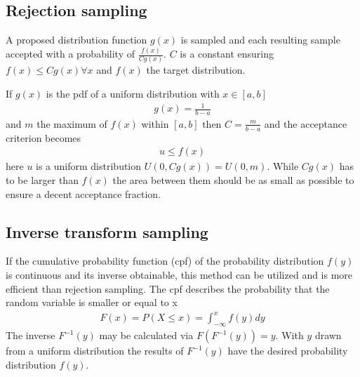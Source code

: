 \documentclass[letterpaper,10pt,english]{sphinxmanual}
\begin{document}
\subsection{Rejection sampling}
\label{\detokenize{NBodySimulation/Initialization:rejection-sampling}}
\sphinxAtStartPar
A proposed distribution function \(g(x)\) is sampled and each resulting sample accepted with a probability of \(\frac{f(x)}{Cg(x)}\).
\(C\) is a constant ensuring \(f(x)\leqslant Cg(x) \forall x\) and \(f(x)\) the target distribution.

\sphinxAtStartPar
If \(g(x)\) is the pdf of a uniform distribution with \(x \in \left [ a,b \right ]\)
\begin{equation*}
\begin{split}g(x)=\frac{1}{b-a}\end{split}
\end{equation*}
\sphinxAtStartPar
and \(m\) the maximum of \(f(x)\) within \(\left [ a,b \right ]\) then \(C=\frac{m}{b-a}\) and the acceptance criterion becomes
\begin{equation*}
\begin{split}u \leq f(x)\end{split}
\end{equation*}
\sphinxAtStartPar
here \(u\) is a uniform distribution \(U(0,Cg(x)) = U(0,m)\). While \(Cg(x)\) has to be larger than \(f(x)\) the area between them should be as small as possible to ensure a decent acceptance fraction.


\subsection{Inverse transform sampling}
\label{\detokenize{NBodySimulation/Initialization:inverse-transform-sampling}}
\sphinxAtStartPar
If the cumulative probability function (cpf) of the probability distribution \(f(y)\) is continuous and its inverse obtainable, this method can be utilized and is more efficient than rejection sampling.
The cpf describes the probability that the random variable is smaller or equal to x
\begin{equation*}
\begin{split}F(x)=P(X \leq x) = \int_{-\infty }^{x}f(y) dy\end{split}
\end{equation*}
\sphinxAtStartPar
The inverse \(F^{-1}(y)\) may be calculated via \(F(F^{-1}(y)) = y\). With \(y\) drawn from a uniform distribution the results of \(F^{-1}(y)\) have the desired probability distribution \(f(y)\).
\end{document}
